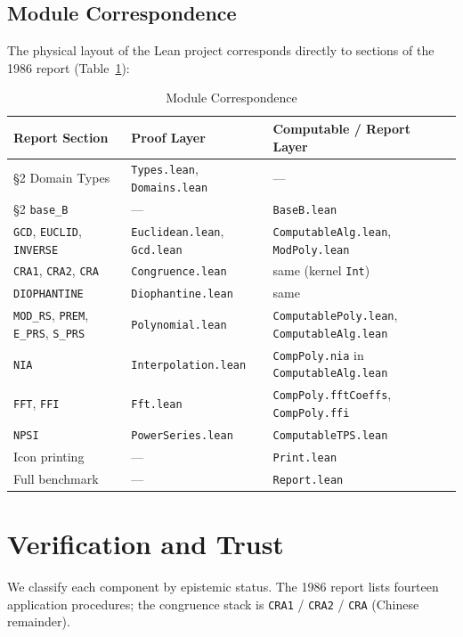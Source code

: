 \documentclass[11pt,a4paper]{article}
\begin{document}
\subsection{Module Correspondence}
The physical layout of the Lean project corresponds directly to sections of the 1986 report (Table~\ref{tab:correspondence}):

\begin{table}[htbp]
\centering
\caption{Module Correspondence}
\label{tab:correspondence}
\footnotesize
\begin{tabularx}{\textwidth}{@{}l>{\raggedright\arraybackslash}X>{\raggedright\arraybackslash}X@{}}
\toprule
\textbf{Report Section} & \textbf{Proof Layer} & \textbf{Computable / Report Layer} \\
\midrule
\S2 Domain Types & \texttt{Types.lean}, \texttt{Domains.lean} & --- \\
\S2 \texttt{base\_B} & --- & \texttt{BaseB.lean} \\
\texttt{GCD}, \texttt{EUCLID}, \texttt{INVERSE} & \texttt{Euclidean.lean}, \texttt{Gcd.lean} & \texttt{ComputableAlg.lean}, \texttt{ModPoly.lean} \\
\texttt{CRA1}, \texttt{CRA2}, \texttt{CRA} & \texttt{Congruence.lean} & same (kernel \texttt{Int}) \\
\texttt{DIOPHANTINE} & \texttt{Diophantine.lean} & same \\
\texttt{MOD\_RS}, \texttt{PREM}, \texttt{E\_PRS}, \texttt{S\_PRS} & \texttt{Polynomial.lean} & \texttt{ComputablePoly.lean}, \texttt{ComputableAlg.lean} \\
\texttt{NIA} & \texttt{Interpolation.lean} & \texttt{CompPoly.nia} in \texttt{ComputableAlg.lean} \\
\texttt{FFT}, \texttt{FFI} & \texttt{Fft.lean} & \texttt{CompPoly.fftCoeffs}, \texttt{CompPoly.ffi} \\
\texttt{NPSI} & \texttt{PowerSeries.lean} & \texttt{ComputableTPS.lean} \\
Icon printing & --- & \texttt{Print.lean} \\
Full benchmark & --- & \texttt{Report.lean} \\
\bottomrule
\end{tabularx}
\end{table}

\section{Verification and Trust}
We classify each component by epistemic status. The 1986 report lists fourteen application procedures; the congruence stack is \texttt{CRA1} / \texttt{CRA2} / \texttt{CRA} (Chinese remainder).
\end{document}
